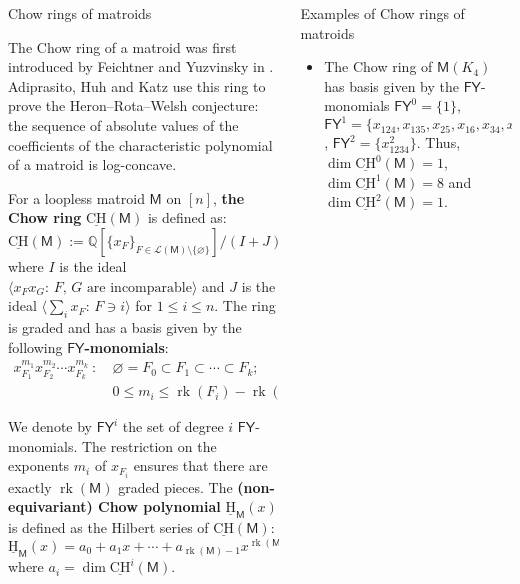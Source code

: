 \documentclass[final]{beamer}
\newlength{\onecolwid}
\newlength{\twocolwid}
\DeclareMathOperator{\rk}{rk}
\newcommand{\M}{\mathsf{M}}
\newcommand{\FY}{\mathsf{FY}}
\newcommand{\uH}{\underline{\mathrm{H}}}
\newcommand{\uCH}{\underline{\mathrm{CH}}}
\newcommand{\cL}{\mathcal{L}}
\begin{document}
\begin{frame}[t]
\begin{columns}[t]
\begin{column}{\onecolwid}
\vspace{-5mm}
\begin{block}{Chow rings of matroids}
\kern0pt
\raggedright
The Chow ring of a matroid was first introduced by Feichtner and Yuzvinsky in \cite{Feichtner_2004}.
Adiprasito, Huh and Katz \cite{adiprasito-2018} use this ring to prove
the Heron--Rota--Welsh conjecture: the sequence of absolute values of the
coefficients of the characteristic polynomial of a matroid is log-concave.

For a loopless matroid $\M$ on $[n]$,
\textbf{the Chow ring} $\uCH(\M)$ is defined as:
\[\uCH(\M):=\mathbb{Q}\left[\{x_F\}_{F\in \cL(\M)\setminus\{\varnothing\}}\right]/(I+J)\]
where $I$ is the ideal $\langle x_Fx_G:\, F,\, G \text{ are incomparable}\rangle$
and $J$ is the ideal $\langle \sum_i{x_F}:\, F\ni i\rangle$ for $1\leq i\leq n$. The ring is graded and has a basis given
by the following \textbf{$\FY$-monomials}:
\begin{align*}
    x_{F_1}^{m_1}x_{F_2}^{m_2}\cdots x_{F_k}^{m_k}\ :&\
    \varnothing = F_0\subset F_1\subset\cdots\subset F_k;\\
    &\ 0\leq m_i\leq \rk(F_i)-\rk(F_{i-1})-1.
\end{align*}

\vspace{2mm}
We denote by $\FY^i$ the set of degree $i$ $\FY$-monomials.
The restriction on the exponents $m_i$ of $x_{F_i}$ ensures that there are exactly $\rk(\M)$ graded pieces.
The \textbf{(non-equivariant) Chow polynomial} $\uH_\M(x)$ is defined as the Hilbert series of $\uCH(\M)$:
\[\uH_{\M}(x) = a_0 + a_1x+\cdots + a_{\rk(\M)-1}x^{\rk(\M)-1},\]
where $a_i = \dim \uCH^i(\M)$.

\end{block}

\end{column} %

\begin{column}{\twocolwid} %

\begin{block}{Examples of Chow rings of matroids}

    \begin{itemize}
        \item The Chow ring of $\M(K_4)$ has basis given by the $\FY$-monomials
        \(\FY^0 = \{1\}\), \(\FY^1 = \{x_{124},
        x_{135},x_{25},x_{16},x_{34},x_{236},x_{456},x_{1234}\}\), \(\FY^2 = \{x^2_{1234}\}.\)
        Thus, $\dim \uCH^0(\M) = 1$, $\dim \uCH^1(\M) = 8$ and $\dim \uCH^2(\M) = 1$.


\end{itemize}
\end{block}
\end{column}
\end{columns}
\end{frame}
\end{document}

